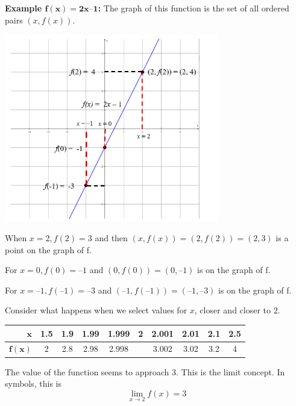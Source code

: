 \documentclass[14pt]{extarticle}
\begin{document}
\textbf{Example $\mathbf{f(x) =2x–1}$:} The graph of this function is the set of all ordered pairs $(x, f(x))$.
	\begin{center}
		\includegraphics[width=0.7\textwidth]{9-1-intro-1}
	\end{center}
When $x=2, f(2) = 3$ and then $(x, f(x)) = (2, f(2)) = (2, 3)$ is a point on the graph of f.

For $x = 0,  f(0) = –1$ and $(0, f(0)) = (0, –1)$ is on the graph of f.

For $x = –1,  f(–1) = –3$ and $(–1, f(–1)) = (–1, –3)$ is on the graph of f.

Consider what happens when we select values for $x$, closer and closer to $2$.
\begin{center}

\begin{tabular}{|r|c|c|c|c|c|c|c|c|c|}
	\hline
	$\mathbf{x}$ & 1.5 & 1.9 & 1.99 & 1.999 & 2 & 2.001 & 2.01 & 2.1 & 2.5 \\
	\hline
	$\mathbf{f(x)}$ & 2 & 2.8 & 2.98 & 2.998 & \hspace{2cm} & 3.002 & 3.02 & 3.2 & 4 \\
	\hline
\end{tabular}
\end{center}
The value of the function seems to approach $3$. This is the limit concept. In symbols, this is
$$\lim_{x\to 2} f(x)=3$$
\end{document}
